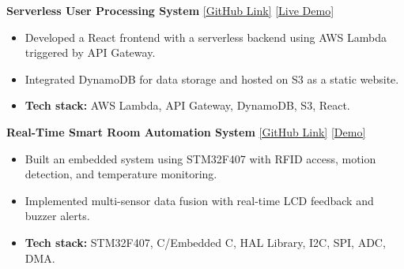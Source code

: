 \documentclass[a4paper,10.5pt]{article}
\begin{document}
\vspace{0.2cm}


\textbf{Serverless User Processing System} \hfill
{\small \href{https://github.com/Muhammad-Ahmad17/getApiForUserData}{[GitHub Link]} \enspace \href{http://user-processing-system-ahmad.s3-website-us-east-1.amazonaws.com/}{[Live Demo]}}
\begin{itemize}[nosep, leftmargin=1.5em, topsep=2pt]
  \item Developed a React frontend with a serverless backend using AWS Lambda triggered by API Gateway.
  \item Integrated DynamoDB for data storage and hosted on S3 as a static website.
  \item \textbf{Tech stack:} AWS Lambda, API Gateway, DynamoDB, S3, React.
\end{itemize}

\vspace{0.2cm}

\textbf{Real-Time Smart Room Automation System} \hfill
{\small \href{https://github.com/Muhammad-Ahmad17/RealTimeSmartRoomAutomation}{[GitHub Link]} \enspace \href{https://www.aahmad.tech/projects/brokendemo.mp4}{[Demo]}}
\begin{itemize}[nosep, leftmargin=1.5em, topsep=2pt]
 \item Built an embedded system using STM32F407 with RFID access, motion detection, and temperature monitoring.
 \item Implemented multi-sensor data fusion with real-time LCD feedback and buzzer alerts.
 \item \textbf{Tech stack:} STM32F407, C/Embedded C, HAL Library, I2C, SPI, ADC, DMA.
\end{itemize}
\end{document}

